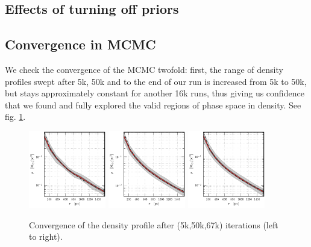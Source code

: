 \subsection{Effects of turning off priors}



\subsection{Convergence in MCMC}
We check the convergence of the MCMC twofold: first, the range of
density profiles swept after 5k, 50k and to the end of our run is
increased from 5k to 50k, but stays approximately constant for another
16k runs, thus giving us confidence that we found and fully explored
the valid regions of phase space in density. See fig. \ref{fig:convergencedens}.

\begin{figure}
\begin{center}
\hspace{-7mm}
\includegraphics[width=0.3\textwidth]{fig/20130718132442_case_2_10000_0_cprior_nulog_denslog_mslope_rprior_5kits_profdens.pdf}
\includegraphics[width=0.3\textwidth]{fig/20130718132442_case_2_10000_0_cprior_nulog_denslog_mslope_rprior_50kits_profdens.pdf}
\includegraphics[width=0.3\textwidth]{fig/20130718132442_case_2_10000_0_cprior_nulog_denslog_mslope_rprior_67kits_profdens.pdf}
\caption{Convergence of the density profile after (5k,50k,67k) iterations (left to right).}
\label{fig:convergencedens}
\end{center}
\end{figure}

